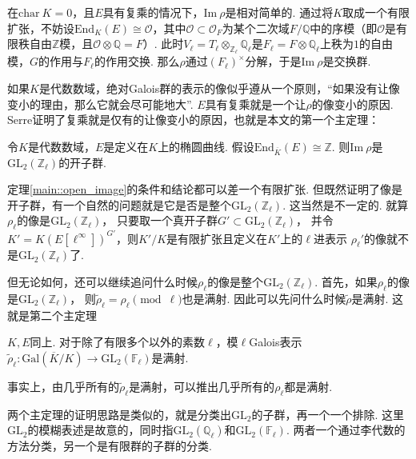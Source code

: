 在$\mathrm{char}\ K = 0$，且$E$具有复乘的情况下，$\mathrm{Im}\ \rho$是相对简单的. 通过将$K$取成一个有限扩张，不妨设$\mathrm{End}_K(E) \cong \mathcal{O}$，其中$\mathcal{O}\subset \mathcal{O}_F$为某个二次域$F/\mathbb{Q}$中的序模（即$\mathcal{O}$是有限秩自由$\mathbb{Z}$模，且$\mathcal{O}\otimes \mathbb{Q} = F$）. 此时$V_{\ell} =T_{\ell} \otimes_{\mathbb{Z}_{\ell}} \mathbb{Q}_{\ell}$是$F_{\ell} = F \otimes \mathbb{Q}_{\ell}$上秩为$1$的自由模，$G$的作用与$F_{\ell}$的作用交换. 那么$\rho$通过$(F_{\ell})^{\times}$分解，于是$\mathrm{Im}\ \rho$是交换群.

如果$K$是代数数域，绝对Galois群的表示的像似乎遵从一个原则，“如果没有让像变小的理由，那么它就会尽可能地大”. $E$具有复乘就是一个让$\rho$的像变小的原因. Serre证明了复乘就是仅有的让像变小的原因，也就是本文的第一个主定理：

\begin{cthm}
    令$K$是代数数域，$E$是定义在$K$上的椭圆曲线. 假设$\mathrm{End}_{\overline{K}}(E) \cong \mathbb{Z}$. 则$\mathrm{Im}\ \rho$是$\mathrm{GL}_2(\mathbb{Z}_{\ell})$的开子群. \label{main::open_image}
\end{cthm}

定理\ref{main::open_image}的条件和结论都可以差一个有限扩张.
但既然证明了像是开子群，有一个自然的问题就是它是否是整个$\mathrm{GL}_2(\mathbb{Z}_{\ell})$.
这当然是不一定的. 就算$\rho_{\ell}$的像是$\mathrm{GL}_2(\mathbb{Z}_{\ell})$，
只要取一个真开子群$G'\subset \mathrm{GL}_2(\mathbb{Z}_{\ell})$，
并令$K' = K(E[\ell^{\infty}])^{G'}$，则$K'/K$是有限扩张且定义在$K'$上的$\ell$进表示
$\rho_{\ell}'$的像就不是$\mathrm{GL}_2(\mathbb{Z}_{\ell})$了.

但无论如何，还可以继续追问什么时候$\rho_{\ell}$的像是整个$\mathrm{GL}_2(\mathbb{Z}_{\ell})$.
首先，如果$\rho_{\ell}$的像是$\mathrm{GL}_2(\mathbb{Z}_{\ell})$，
则$\tilde{\rho}_{\ell} = \rho_{\ell} \pmod{\ell}$也是满射.
因此可以先问什么时候$\tilde{\rho}$是满射. 这就是第二个主定理

\begin{cthm}
    $K, E$同上. 对于除了有限多个以外的素数$\ell$，模$\ell$\quad Galois表示$\tilde{\rho}_{\ell}: \mathrm{Gal}(\overline{K}/K)\to \mathrm{GL}_2(\mathbb{F}_{\ell})$是满射. \label{main::surjective}
\end{cthm}

事实上，由几乎所有的$\tilde{\rho}_{\ell}$是满射，可以推出几乎所有的$\rho_{\ell}$都是满射.

两个主定理的证明思路是类似的，就是分类出$\mathrm{GL}_2$的子群，再一个一个排除. 这里$\mathrm{GL}_2$的模糊表述是故意的，同时指$\mathrm{GL}_2(\mathbb{Q}_{\ell})$和$\mathrm{GL}_2(\mathbb{F}_{\ell})$. 两者一个通过李代数的方法分类，另一个是有限群的子群的分类.

